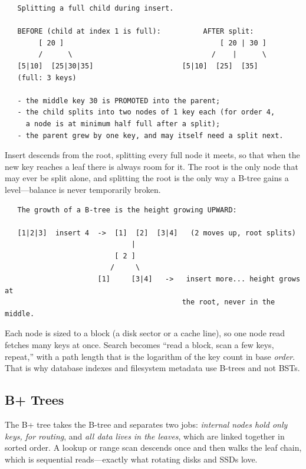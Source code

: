 \begin{verbatim}
   Splitting a full child during insert.

   BEFORE (child at index 1 is full):          AFTER split:
        [ 20 ]                                     [ 20 | 30 ]
        /      \                                 /    |      \
   [5|10]  [25|30|35]                     [5|10]  [25]  [35]
   (full: 3 keys)

   - the middle key 30 is PROMOTED into the parent;
   - the child splits into two nodes of 1 key each (for order 4,
     a node is at minimum half full after a split);
   - the parent grew by one key, and may itself need a split next.
\end{verbatim}

Insert descends from the root, splitting every full node it meets, so
that when the new key reaches a leaf there is always room for it. The
root is the only node that may ever be split alone, and splitting the
root is the only way a B-tree gains a level---balance is never
temporarily broken.

\begin{verbatim}
   The growth of a B-tree is the height growing UPWARD:

   [1|2|3]  insert 4  ->  [1]  [2]  [3|4]   (2 moves up, root splits)
                              |
                          [ 2 ]
                         /     \
                      [1]     [3|4]   ->   insert more... height grows at
                                          the root, never in the middle.
\end{verbatim}

\begin{ruleofthumb}
Each node is sized to a block (a disk sector or a cache line), so one
node read fetches many keys at once. Search becomes ``read a block,
scan a few keys, repeat,'' with a path length that is the logarithm of
the key count in base \emph{order}. That is why database indexes and
filesystem metadata use B-trees and not BSTs.
\end{ruleofthumb}

\subsection{B+ Trees}

The B+ tree takes the B-tree and separates two jobs: \emph{internal
nodes hold only keys, for routing}, and \emph{all data lives in the
leaves}, which are linked together in sorted order. A lookup or range
scan descends once and then walks the leaf chain, which is sequential
reads---exactly what rotating disks and SSDs love.

